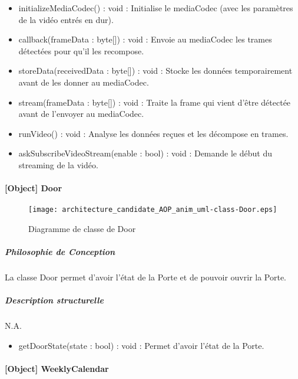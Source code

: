             \begin{itemize}
                \item {initializeMediaCodec() : void : Initialise le mediaCodec (avec les paramètres de la vidéo entrés en dur).}
                \item {callback(frameData : byte[]) : void : Envoie au mediaCodec les trames détectées pour qu'il les recompose.}
                \item {storeData(receivedData : byte[]) : void : Stocke les données temporairement avant de les donner au mediaCodec.}
                \item {stream(frameData : byte[]) : void : Traite la frame qui vient d'être détectée avant de l'envoyer au mediaCodec.}
                \item {runVideo() : void : Analyse les données reçues et les décompose en trames.}
                \item {askSubscribeVideoStream(enable : bool) : void : Demande le début du streaming de la vidéo.}
            \end{itemize}

\newpage 

    \paragraph{[Object] Door}%

    \begin{figure} [H]
    \centering
    \texttt{[image: architecture\_candidate\_AOP\_anim\_uml-class-Door.eps]}
    \caption{Diagramme de classe de Door}
    \label{Classe-Door}
    \end{figure}

    \subparagraph{Philosophie de Conception}%
    La classe Door permet d'avoir l'état de la Porte et de pouvoir ouvrir la Porte.
    \subparagraph{Description structurelle}%

        N.A.
        \begin{itemize}
            \item {getDoorState(state : bool) : void : Permet d'avoir l'état de la Porte.}
        \end{itemize}
\newpage      

    \paragraph{[Object] WeeklyCalendar}%

